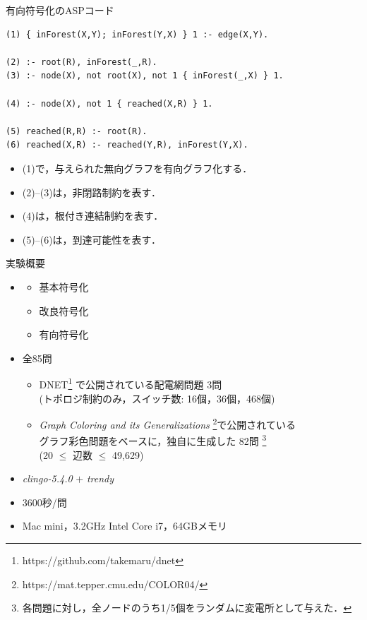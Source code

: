 \documentclass[dvipdfmx,11pt]{beamer}
\begin{document}
\begin{frame}[fragile]{有向符号化のASPコード}
\begin{exampleblock}{}
\begin{lstlisting}
(1) { inForest(X,Y); inForest(Y,X) } 1 :- edge(X,Y).

(2) :- root(R), inForest(_,R).
(3) :- node(X), not root(X), not 1 { inForest(_,X) } 1.

(4) :- node(X), not 1 { reached(X,R) } 1.

(5) reached(R,R) :- root(R).
(6) reached(X,R) :- reached(Y,R), inForest(Y,X).
\end{lstlisting}
\end{exampleblock}
\begin{itemize}
 \item (1)で，与えられた無向グラフを有向グラフ化する．
 \item (2)--(3)は，非閉路制約を表す．
 \item (4)は，根付き連結制約を表す．
 \item (5)--(6)は，到達可能性を表す．
\end{itemize}
\end{frame}
\begin{frame}{実験概要}
  \renewcommand{\thefootnote}{\fnsymbol{footnote}}
  \setcounter{footnote}{1}
  \begin{itemize}
  \item {}
    \begin{itemize}
     \item 基本符号化
     \item 改良符号化
     \item 有向符号化
    \end{itemize}
  \item {} 全85問
    \begin{itemize}
    \item DNET\footnote{https://github.com/takemaru/dnet}%
      で公開されている配電網問題 3問 \\ (トポロジ制約のみ，スイッチ数:
      16個，36個，468個)
    \item \textit{Graph Coloring and its Generalizations}
      \footnote{https://mat.tepper.cmu.edu/COLOR04/}で公開されている \\
      グラフ彩色問題をベースに，独自に生成した 82問 
      \footnote{各問題に対し，全ノードのうち1/5個をランダムに変電所として与えた．}\\
      (20 $\leq$ 辺数 $\leq$ 49,629)
    \end{itemize}
  \item {} \textit{clingo-5.4.0} $+$ \textit{trendy}
  \item {} 3600秒/問
  \item {} Mac mini，3.2GHz Intel Core i7，64GBメモリ
  \end{itemize}
\end{frame}
\end{document}
